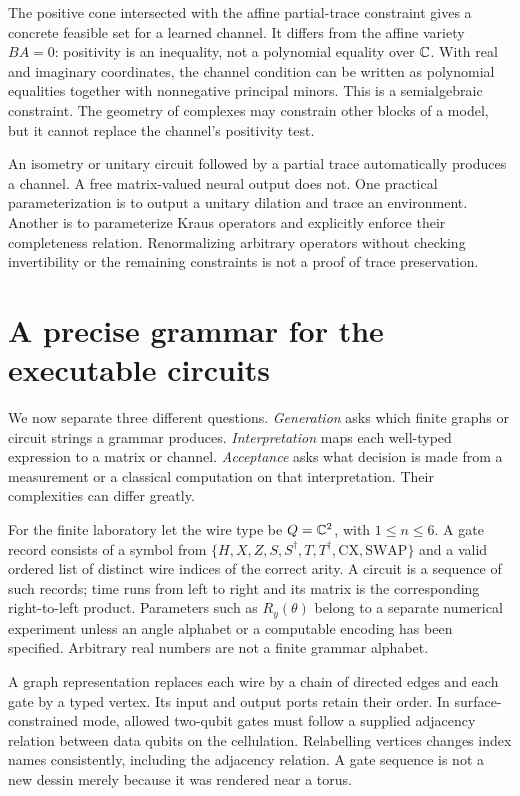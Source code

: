 The positive cone intersected with the affine partial-trace constraint gives a concrete feasible set for a learned channel. It differs from the affine variety $BA=0$: positivity is an inequality, not a polynomial equality over $\mathbb{C}$. With real and imaginary coordinates, the channel condition can be written as polynomial equalities together with nonnegative principal minors. This is a semialgebraic constraint. The geometry of complexes may constrain other blocks of a model, but it cannot replace the channel's positivity test.

An isometry or unitary circuit followed by a partial trace automatically produces a channel. A free matrix-valued neural output does not. One practical parameterization is to output a unitary dilation and trace an environment. Another is to parameterize Kraus operators and explicitly enforce their completeness relation. Renormalizing arbitrary operators without checking invertibility or the remaining constraints is not a proof of trace preservation.

\section{A precise grammar for the executable circuits}

We now separate three different questions. \emph{Generation} asks which finite graphs or circuit strings a grammar produces. \emph{Interpretation} maps each well-typed expression to a matrix or channel. \emph{Acceptance} asks what decision is made from a measurement or a classical computation on that interpretation. Their complexities can differ greatly.

For the finite laboratory let the wire type be $Q=\mathbb{C}^2$, with $1\le n\le6$. A gate record consists of a symbol from $\{H,X,Z,S,S^\dagger,T,T^\dagger,\mathrm{CX},\mathrm{SWAP}\}$ and a valid ordered list of distinct wire indices of the correct arity. A circuit is a sequence of such records; time runs from left to right and its matrix is the corresponding right-to-left product. Parameters such as $R_y(\theta)$ belong to a separate numerical experiment unless an angle alphabet or a computable encoding has been specified. Arbitrary real numbers are not a finite grammar alphabet.

A graph representation replaces each wire by a chain of directed edges and each gate by a typed vertex. Its input and output ports retain their order. In surface-constrained mode, allowed two-qubit gates must follow a supplied adjacency relation between data qubits on the cellulation. Relabelling vertices changes index names consistently, including the adjacency relation. A gate sequence is not a new dessin merely because it was rendered near a torus.

